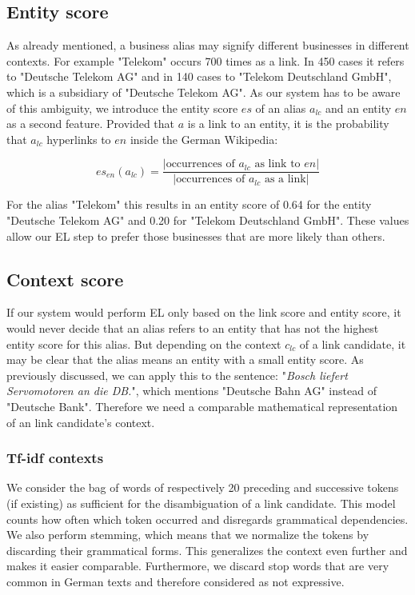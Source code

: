 \subsection{Entity score}
\label{sec:entity_score}
As already mentioned, a business alias may signify different businesses in different contexts. For example "Telekom" occurs 700 times as a link. In 450 cases it refers to "Deutsche Telekom AG" and in 140 cases to "Telekom Deutschland GmbH", which is a subsidiary of "Deutsche Telekom AG".\footnotemark{} As our system has to be aware of this ambiguity, we introduce the entity score $es$ of an alias $a_{lc}$ and an entity $en$ as a second feature. Provided that $a$ is a link to an entity, it is the probability that $a_{lc}$ hyperlinks to $en$ inside the German Wikipedia:

\begin{equation*}
es_{en}(a_{lc}) = \frac{|\text{occurrences of $a_{lc}$ as link to $en$}|}{|\text{occurrences of $a_{lc}$ as a link}|}
\end{equation*}

For the alias "Telekom" this results in an entity score of 0.64 for the entity "Deutsche Telekom AG" and 0.20 for "Telekom Deutschland GmbH". These values allow our EL step to prefer those businesses that are more likely than others.


\subsection{Context score}
\label{sec:context_score}
If our system would perform EL only based on the link score and entity score, it would never decide that an alias refers to an entity that has not the highest entity score for this alias. But depending on the context $c_{lc}$ of a link candidate, it may be clear that the alias means an entity with a small entity score. As previously discussed, we can apply this to the sentence: "\textit{Bosch liefert Servomotoren an die DB.}", which mentions "Deutsche Bahn AG" instead of "Deutsche Bank". Therefore we need a comparable mathematical representation of an link candidate's context.


\subsubsection{Tf-idf contexts}
\label{sec:tf_idf}
We consider the bag of words of respectively 20 preceding and successive tokens (if existing) as sufficient for the disambiguation of a link candidate. This model counts how often which token occurred and disregards grammatical dependencies. We also perform stemming, which means that we normalize the tokens by discarding their grammatical forms. This generalizes the context even further and makes it easier comparable. Furthermore, we discard stop words that are very common in German texts and therefore considered as not expressive.

